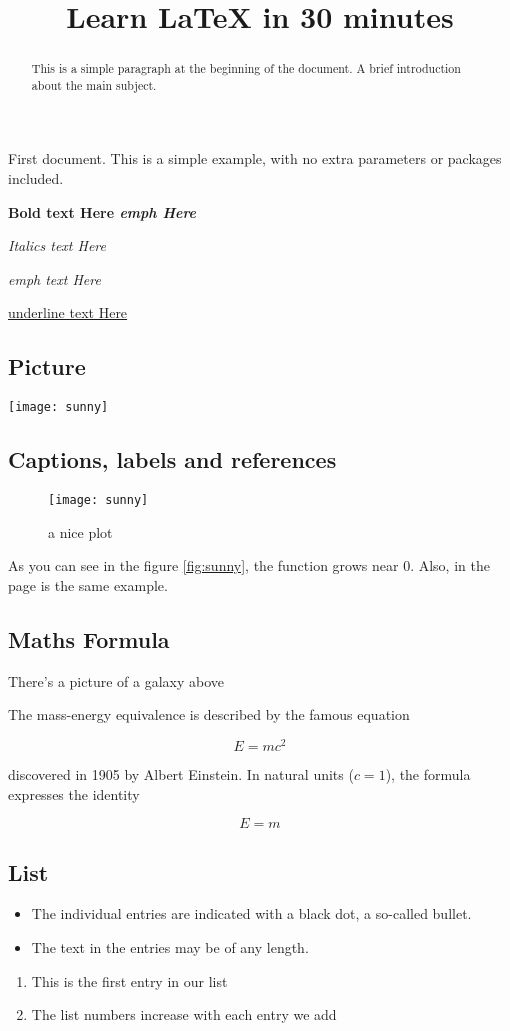 \documentclass{article}
\title{Learn LaTeX in 30 minutes}
\begin{document}
\maketitle

\tableofcontents

\begin{abstract}
This is a simple paragraph at the beginning of the 
document. A brief introduction about the main subject.
\end{abstract}
\newpage
First document. This is a simple example, with no 
extra parameters or packages included.

\textbf{Bold text Here \emph{emph Here}}

\textit{Italics text Here}

\emph{emph text Here}

\underline{underline text Here}

\subsection{Picture}
\texttt{[image: sunny]}
\subsection{Captions, labels and references}
\begin{figure}[h]
    \centering
    \texttt{[image: sunny]}
    \caption{a nice plot}
    \label{fig:mesh1}
\end{figure}
 
As you can see in the figure \ref{fig:sunny}, the 
function grows near 0. Also, in the page \pageref{fig:sunny} 
is the same example.

\subsection{Maths Formula}
There's a picture of a galaxy above

The mass-energy equivalence is described by the famous equation
 
\[E=mc^2 \]
 
discovered in 1905 by Albert Einstein. 
In natural units ($c = 1$), the formula expresses the identity
 
\begin{equation}
E=m
\end{equation}

\subsection{List}
\begin{itemize}
  \item The individual entries are indicated with a black dot, a so-called bullet.
  \item The text in the entries may be of any length.
\end{itemize}
\begin{enumerate}
  \item This is the first entry in our list
  \item The list numbers increase with each entry we add
\end{enumerate}
\end{document}
